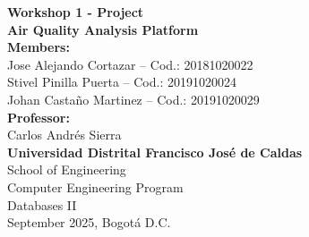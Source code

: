 \documentclass[12pt]{article}
\begin{document}
\begin{titlepage}
    \centering
    \vspace*{1cm}
    
    \Huge
    \textbf{Workshop 1 - Project}\\[0.5cm]
    
    \LARGE
    \textbf{Air Quality Analysis Platform}\\[2cm]
    
    \Large
    \textbf{Members:}\\[0.5cm]
    Jose Alejando Cortazar – Cod.: 20181020022\\
    Stivel Pinilla Puerta – Cod.: 20191020024\\
    Johan Castaño Martinez – Cod.: 20191020029\\[2cm]
    
    \textbf{Professor:}\\[0.5cm]
    Carlos Andrés Sierra\\[2cm]
    
    \textbf{Universidad Distrital Francisco José de Caldas}\\
    School of Engineering\\
    Computer Engineering Program\\
    Databases II\\[2cm]
    
    September 2025, Bogotá D.C.
\end{titlepage}

\newpage

\tableofcontents
\newpage






% 
% 
% 
% 
% 
% 


\end{document}
